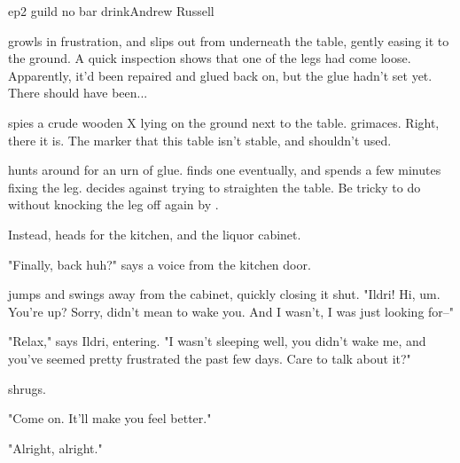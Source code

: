 \documentclass{book}
\begin{document}
\begin{childnode}{ep2 guild no bar drink}{Andrew Russell}

    \name{} growls in frustration, and slips out from underneath the table, gently easing it to the ground. A quick inspection shows that one of the legs had come loose. Apparently, it'd been repaired and glued back on, but the glue hadn't set yet. There should
    have been...

    \name{} spies a crude wooden X lying on the ground next to the table. \HeShe{} grimaces. Right, there it is. The marker that this table isn't stable, and shouldn't used.

    \name{} hunts around for an urn of glue. \HeShe{} finds one eventually, and spends a few minutes fixing the leg. \HeShe{} decides against trying to straighten the table. Be tricky to do without knocking the leg off again by \himselfherself{}.

    Instead, \heshe{} heads for the kitchen, and the liquor cabinet. 

    "Finally, back huh?" says a voice from the kitchen door.

    \name{} jumps and swings away from the cabinet, quickly closing it shut. "Ildri! Hi, um. You're up? Sorry, didn't mean to wake you. And I wasn't, I was just looking for--"

    "Relax," says Ildri, entering. "I wasn't sleeping well, you didn't wake me, and you've seemed pretty frustrated the past few days. Care to talk about it?"  

    \name{} shrugs.

    "Come on. It'll make you feel better." 

    "Alright, alright."


\end{childnode}
\end{document}

